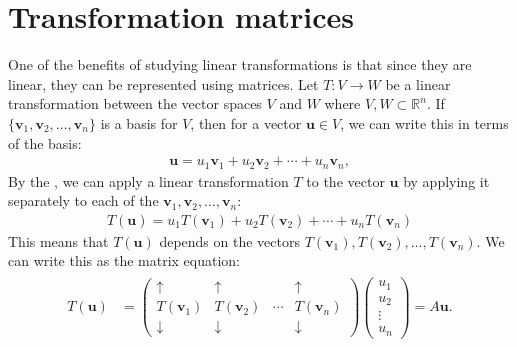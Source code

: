 \documentclass[letterpaper,10pt,english]{jupyterBook}
\begin{document}
\section{Transformation matrices}
\label{\detokenize{_pages/6.1_Transformation_matrices:transformation-matrices}}\label{\detokenize{_pages/6.1_Transformation_matrices:transformation-matrices-section}}\label{\detokenize{_pages/6.1_Transformation_matrices::doc}}
\sphinxAtStartPar
One of the benefits of studying linear transformations is that since they are linear, they can be represented using matrices. Let \(T: V \to W\) be a linear transformation between the vector spaces \(V\) and \(W\) where \(V, W \subset \mathbb{R}^n\). If \(\{\mathbf{v}_1, \mathbf{v}_2, \ldots, \mathbf{v}_n\}\) is a basis for \(V\), then for a vector \(\mathbf{u} \in V\), we can write this in terms of the basis:
\begin{equation*}
\begin{split} \mathbf{u} = u_1 \mathbf{v}_1 + u_2 \mathbf{v}_2 + \cdots + u_n \mathbf{v}_n, \end{split}
\end{equation*}
\sphinxAtStartPar
By the {\hyperref[\detokenize{_pages/6.0_Linear_transformations:linear-transformation-definition}]{}}, we can apply a linear transformation \(T\) to the vector \(\mathbf{u}\) by applying it separately to each of the \(\mathbf{v}_1, \mathbf{v}_2, \ldots, \mathbf{v}_n\):
\begin{equation*}
\begin{split} T(\mathbf{u}) = u_1 T(\mathbf{v}_1) + u_2 T(\mathbf{v}_2) + \cdots + u_n T(\mathbf{v}_n)\end{split}
\end{equation*}
\sphinxAtStartPar
This means that \(T(\mathbf{u})\) depends on the vectors \(T(\mathbf{v}_1), T(\mathbf{v}_2), \ldots, T(\mathbf{v}_n)\). We can write this as the matrix equation:
\begin{equation*}
\begin{split} \begin{align*}
    T(\mathbf{u}) &= \begin{pmatrix}
        \uparrow & \uparrow & & \uparrow \\
        T(\mathbf{v}_1) & T(\mathbf{v}_2) & \cdots & T(\mathbf{v}_n) \\
        \downarrow & \downarrow & & \downarrow
    \end{pmatrix}
    \begin{pmatrix} u_1 \\ u_2 \\ \vdots \\ u_n \end{pmatrix}
    = A \mathbf{u}.
\end{align*} \end{split}
\end{equation*}
\end{document}
